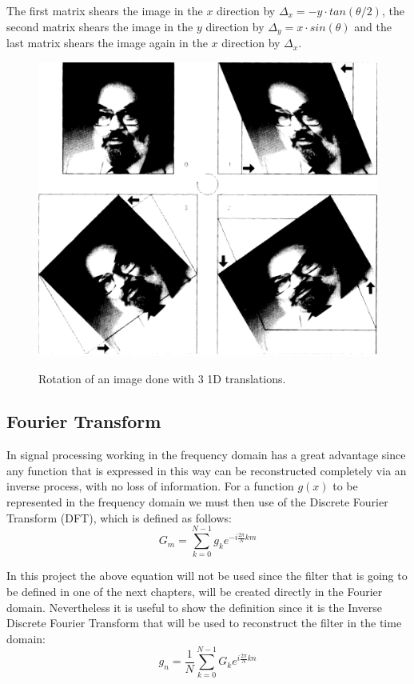 \documentclass[]{usiinfbachelorproject}
\begin{document}
	The first matrix shears the image in the $x$ direction by $\Delta_x = -y\cdot tan(\theta/2)$, the second matrix shears the image in the $y$ direction by $\Delta_y = x \cdot sin(\theta)$ and the last matrix shears the image again in the $x$ direction by $\Delta_x$.
	
	\begin{figure}[H]
		\centering
		\includegraphics[width=0.5\columnwidth]{images/unser_rotation.png}
		\caption{Rotation of an image done with 3 1D translations.}
		\cite{main_article}
	\end{figure}
	
		
	\subsection{Fourier Transform}
	In signal processing working in the frequency domain has a great advantage since any function that is expressed in this way can be reconstructed completely via an inverse process, with no loss of information.\cite{image_book}
	For a function $g(x)$ to be represented in the frequency domain we must then use of the Discrete Fourier Transform (DFT), which is defined as follows:
	\begin{equation}
		G_m = \displaystyle\sum_{k=0}^{N-1}g_ke^{-i \frac{2\pi}{N}km}
	\end{equation}
	
	In this project the above equation will not be used since the filter that is going to be defined in one of the next chapters, will be created directly in the Fourier domain. Nevertheless it is useful to show the definition since it is the Inverse Discrete Fourier Transform that will be used to reconstruct the filter in the time domain:
	\begin{equation}
		g_n = \frac{1}{N}\displaystyle\sum_{k=0}^{N-1}G_ke^{i \frac{2\pi}{N}kn}
	\end{equation}
	
\end{document}
